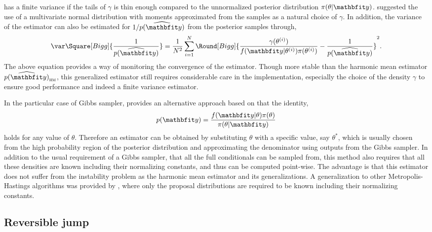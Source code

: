 has a finite variance if the tails of $\gamma$ is thin enough compared to the
unnormalized posterior distribution $\pi(\theta|\data)$.
\textcite{Gelfand:1994ux} suggested the use of a multivariate normal
distribution with moments approximated from the samples as a natural choice of
$\gamma$. In addition, the variance of the estimator can also be estimated for
$1/\widehat{p(\data)}$ from the posterior samples through,
\begin{equation}
  \var\Square[Bigg]{\frac{1}{\widehat{p(\data)}}} =
  \frac{1}{N^2}\sum_{i=1}^N \Round[Bigg]{
    \frac{\gamma(\supi\theta)}{f(\data|\supi\theta)\pi(\supi\theta)}
    - \frac{1}{\widehat{p(\data)}}}^2.
\end{equation}
The above equation provides a way of monitoring the convergence of the
estimator. Though more stable than the harmonic mean estimator
$\widehat{p(\data)}_{\text{\textsc{hm}}}$, this generalized estimator still
requires considerable care in the implementation, especially the choice of the
density $\gamma$ to ensure good performance and indeed a finite variance
estimator.

In the particular case of Gibbs sampler, \textcite{Chib:1995em} provides an
alternative approach based on that the identity,
\begin{equation}
  p(\data) = \frac{f(\data|\theta)\pi(\theta)}{\pi(\theta|\data)}
\end{equation}
holds for any value of $\theta$. Therefore an estimator can be obtained by
substituting $\theta$ with a specific value, say $\theta^*$, which is usually
chosen from the high probability region of the posterior distribution and
approximating the denominator using outputs from the Gibbs sampler. In
addition to the usual requirement of a Gibbs sampler, that all the full
conditionals can be sampled from, this method also requires that all these
densities are known including their normalizing constants, and thus can be
computed point-wise. The advantage is that this estimator does not suffer from
the instability problem as the harmonic mean estimator and its
generalizations. A generalization to other Metropolis-Hastings algorithms was
provided by \textcite{Chib:2001gq}, where only the proposal distributions are
required to be known including their normalizing constants.

\subsection{Reversible jump \protect\mcmc}
\label{sub:Reversible jump mcmc}

